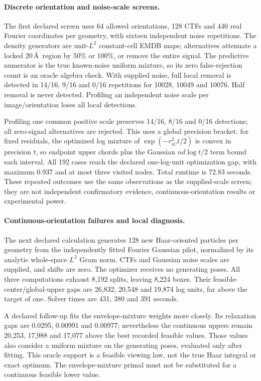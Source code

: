 \paragraph{Discrete orientation and noise-scale screens.}
The first declared screen uses 64 allowed orientations, 128 CTFs and 440 real
Fourier coordinates per geometry, with sixteen independent noise repetitions.
The density generators are unit-$L^2$ constant-cell EMDB maps; alternatives
attenuate a locked 20\,\AA\ region by 50\% or 100\%, or remove the entire signal.
The predictive numerator is the true known-noise uniform mixture, so its
zero false-rejection count is an oracle algebra check. With supplied noise,
full local removal is detected in 14/16, 9/16 and 0/16 repetitions for
10028, 10049 and 10076. Half removal is never detected. Profiling an independent
noise scale per image/orientation loses all local detections.

Profiling one common positive scale preserves 14/16, 8/16 and 0/16 detections;
all zero-signal alternatives are rejected. This uses a global precision
bracket: for fixed residuals, the optimized log mixture of
$\exp(-r_{iC}^2t/2)$ is convex in precision $t$, so endpoint upper chords plus
the Gaussian $nd\log t/2$ term bound each interval. All 192 cases reach the
declared one-log-unit optimization gap, with maximum 0.937 and at most three
visited nodes. Total runtime is 72.83 seconds. These repeated outcomes use the
same observations as the supplied-scale screen; they are not independent
confirmatory evidence, continuous-orientation results or experimental power.

\paragraph{Continuous-orientation failures and local diagnosis.}
The next declared calculation generates 128 new Haar-oriented particles per
geometry from the independently fitted Fourier Gaussian pilot, normalized by
its analytic whole-space $L^2$ Gram norm. CTFs and Gaussian noise scales are
supplied, and shifts are zero. The optimizer receives no generating poses.
All three computations exhaust 8,192 splits, leaving 8,224 boxes. Their
feasible-center/global-upper gaps are 26,832, 20,548 and 19,874 log units, far
above the target of one. Solver times are 431, 380 and 391 seconds.

A declared follow-up fits the envelope-mixture weights more closely. Its
relaxation gaps are 0.0295, 0.00991 and 0.00977; nevertheless the continuous
uppers remain 20,253, 17,988 and 17,077 above the best recorded feasible values.
Those values also consider a uniform mixture on the generating poses,
evaluated only after fitting. This oracle support is a feasible viewing law,
not the true Haar integral or exact optimum. The envelope-mixture primal must
not be substituted for a continuous feasible lower value.

